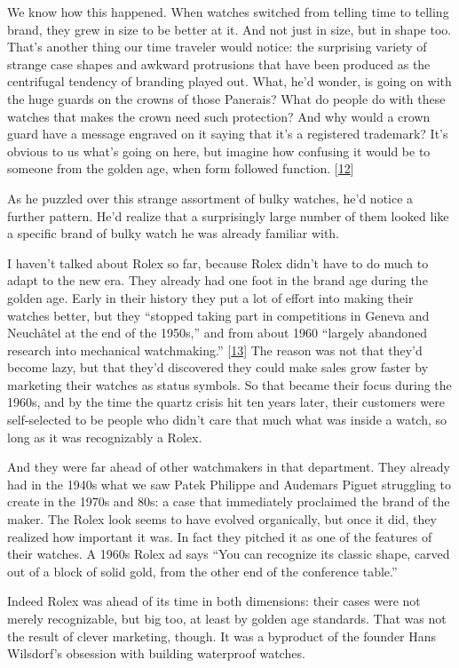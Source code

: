 We know how this happened. When watches switched from telling time to
telling brand, they grew in size to be better at it. And not just in
size, but in shape too. That's another thing our time traveler would
notice: the surprising variety of strange case shapes and awkward
protrusions that have been produced as the centrifugal tendency of
branding played out. What, he'd wonder, is going on with the huge guards
on the crowns of those Panerais? What do people do with these watches
that makes the crown need such protection? And why would a crown guard
have a message engraved on it saying that it's a registered trademark?
It's obvious to us what's going on here, but imagine how confusing it
would be to someone from the golden age, when form followed function.
{[}\hyperref[f12n]{12}{]}

As he puzzled over this strange assortment of bulky watches, he'd notice
a further pattern. He'd realize that a surprisingly large number of them
looked like a specific brand of bulky watch he was already familiar
with.

I haven't talked about Rolex so far, because Rolex didn't have to do
much to adapt to the new era. They already had one foot in the brand age
during the golden age. Early in their history they put a lot of effort
into making their watches better, but they ``stopped taking part in
competitions in Geneva and Neuchâtel at the end of the 1950s,'' and from
about 1960 ``largely abandoned research into mechanical watchmaking.''
{[}\hyperref[f13n]{13}{]} The reason was not that they'd become lazy,
but that they'd discovered they could make sales grow faster by
marketing their watches as status symbols. So that became their focus
during the 1960s, and by the time the quartz crisis hit ten years later,
their customers were self-selected to be people who didn't care that
much what was inside a watch, so long as it was recognizably a Rolex.

And they were far ahead of other watchmakers in that department. They
already had in the 1940s what we saw Patek Philippe and Audemars Piguet
struggling to create in the 1970s and 80s: a case that immediately
proclaimed the brand of the maker. The Rolex look seems to have evolved
organically, but once it did, they realized how important it was. In
fact they pitched it as one of the features of their watches. A 1960s
Rolex ad says ``You can recognize its classic shape, carved out of a
block of solid gold, from the other end of the conference table.''

Indeed Rolex was ahead of its time in both dimensions: their cases were
not merely recognizable, but big too, at least by golden age standards.
That was not the result of clever marketing, though. It was a byproduct
of the founder Hans Wilsdorf's obsession with building waterproof
watches.

